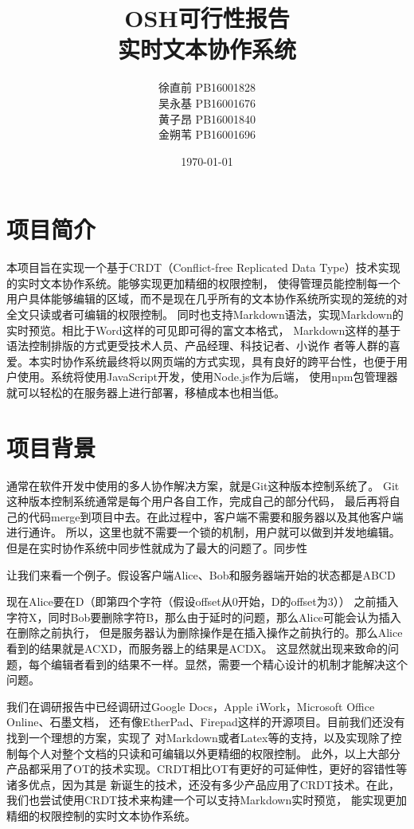 \documentclass[11pt]{ctexart}
\title{OSH可行性报告\\[2ex]实时文本协作系统}
\author{徐直前 PB16001828\\吴永基 PB16001676\\黄子昂 PB16001840\\金朔苇 PB16001696\\}
\date{\today}
\begin{document}
\maketitle
\tableofcontents

\section{项目简介}
本项目旨在实现一个基于CRDT（Conflict-free Replicated Data Type）技术实现的实时文本协作系统。能够实现更加精细的权限控制，
使得管理员能控制每一个用户具体能够编辑的区域，而不是现在几乎所有的文本协作系统所实现的笼统的对全文只读或者可编辑的权限控制。
同时也支持Markdown语法，实现Markdown的实时预览。相比于Word这样的可见即可得的富文本格式，
Markdown这样的基于语法控制排版的方式更受技术人员、产品经理、科技记者、小说作
者等人群的喜爱。本实时协作系统最终将以网页端的方式实现，具有良好的跨平台性，也便于用户使用。系统将使用JavaScript开发，使用Node.js作为后端，
使用npm包管理器就可以轻松的在服务器上进行部署，移植成本也相当低。
\section{项目背景}
通常在软件开发中使用的多人协作解决方案，就是Git这种版本控制系统了。
Git这种版本控制系统通常是每个用户各自工作，完成自己的部分代码，
最后再将自己的代码merge到项目中去。在此过程中，客户端不需要和服务器以及其他客户端进行通许。
所以，这里也就不需要一个锁的机制，用户就可以做到并发地编辑。
但是在实时协作系统中同步性就成为了最大的问题了。同步性

让我们来看一个例子。假设客户端Alice、Bob和服务器端开始的状态都是ABCD

现在Alice要在D（即第四个字符（假设offset从0开始，D的offset为3））
之前插入字符X，同时Bob要删除字符B，那么由于延时的问题，那么Alice可能会认为插入在删除之前执行，
但是服务器认为删除操作是在插入操作之前执行的。那么Alice看到的结果就是ACXD，而服务器上的结果是ACDX。
这显然就出现来致命的问题，每个编辑者看到的结果不一样。显然，需要一个精心设计的机制才能解决这个问题。

我们在调研报告中已经调研过Google Docs，Apple iWork，Microsoft Office Online、石墨文档，
还有像EtherPad、Firepad这样的开源项目。目前我们还没有找到一个理想的方案，实现了
对Markdown或者Latex等的支持，以及实现除了控制每个人对整个文档的只读和可编辑以外更精细的权限控制。
此外，以上大部分产品都采用了OT的技术实现。CRDT相比OT有更好的可延伸性，更好的容错性等诸多优点，因为其是
新诞生的技术，还没有多少产品应用了CRDT技术。在此，我们也尝试使用CRDT技术来构建一个可以支持Markdown实时预览，
能实现更加精细的权限控制的实时文本协作系统。
\end{document}
